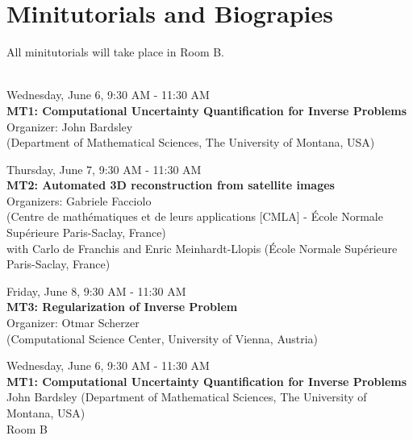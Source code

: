 

\chapter*{Minitutorials and Biograpies}

{\Large{All minitutorials will take place in Room B.}}\\\\

\begin{center}{\large{
      Wednesday, June 6, 9:30 AM - 11:30 AM \\
      \textbf{MT1: Computational Uncertainty Quantification for Inverse Problems}\\
      Organizer: John Bardsley \\(Department of Mathematical Sciences, The University of Montana, USA)}}
\end{center}
\vspace{0.5cm}

\begin{center}{\large{
      Thursday, June 7, 9:30 AM - 11:30 AM \\
      \textbf{MT2: Automated 3D reconstruction from satellite images}\\
      Organizers: Gabriele Facciolo\\ (Centre de math\'ematiques et de leurs applications [CMLA] - \'Ecole Normale Sup\'erieure Paris-Saclay, France) \\with Carlo de Franchis and Enric Meinhardt-Llopis (\'Ecole Normale Sup\'erieure Paris-Saclay, France)  }}
\end{center}
\vspace{0.5cm}

\begin{center}{\large{
      Friday, June 8, 9:30 AM - 11:30 AM \\
      \textbf{MT3: Regularization of Inverse Problem}\\
      Organizer: Otmar Scherzer\\ (Computational Science Center, University of Vienna, Austria) }}
\end{center}

\newpage\vspace{2cm}
\begin{center}{\large{
      Wednesday, June 6, 9:30 AM - 11:30 AM \\
      \textbf{MT1: Computational Uncertainty Quantification for Inverse Problems}\\
      John Bardsley (Department of Mathematical Sciences, The University of Montana, USA)\\ Room B  
}}
\end{center}
\vspace{1cm}

